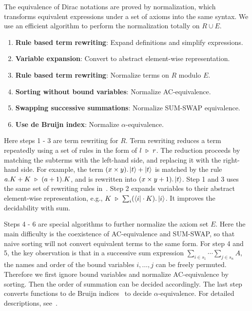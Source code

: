 The equivalence of Dirac notations are proved by normalization, which transforms equivalent expressions under a set of axioms into the same syntax. We use an efficient algorithm to perform the normalization totally on $R \cup E$.

\begin{enumerate}
    \item \textbf{Rule based term rewriting}: Expand definitions and simplify expressions.
    \item \textbf{Variable expansion}: Convert to abstract element-wise representation.
    \item \textbf{Rule based term rewriting}: Normalize terms on \( R \) modulo \( E \).
    \item \textbf{Sorting without bound variables}: Normalize AC-equivalence.
    \item \textbf{Swapping successive summations}: Normalize SUM-SWAP equivalence.
    \item \textbf{Use de Bruijn index}: Normalize \( \alpha \)-equivalence.
\end{enumerate}

Here steps 1 - 3 are term rewriting for $R$. 
Term rewriting reduces a term repeatedly using a set of rules in the form of $l\ \triangleright\ r$. The reduction proceeds by matching the subterms with the left-hand side, and replacing it with the right-hand side. 
For example, the term $(x\times y) . \ket{t} + \ket{t}$ is matched by the rule $a.K + K\ \triangleright\ (a + 1).K$, and is rewritten into $(x\times y + 1) . \ket{t}$.
Step 1 and 3 uses the same set of rewriting rules in~.
Step 2 expands variables to their abstract element-wise representation, e.g., $K \ \triangleright\ \sum_{i} (\bra{i} \cdot K). \ket{i}$. It improves the decidability with sum. 


Steps 4 - 6 are special algorithms to further normalize the axiom set $E$.
Here the main difficulty is the coexistence of AC-equivalence and SUM-SWAP, so that naive sorting will not convert equivalent terms to the same form.
For step 4 and 5, the key observation is that in a successive sum expression \( \sum_{i \in s_1} \cdots \sum_{j \in s_n} A \), the names and order of the bound variables \( i, \dots, j \) can be freely permuted. Therefore we first ignore bound variables and normalize AC-equivalence by sorting. Then the order of summation can be decided accordingly. The last step converts functions to de Bruijn indices~\cite{deBruijn1972lambda} to decide $\alpha$-equivalence. For detailed descriptions, see~.


